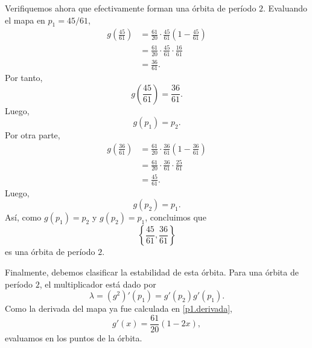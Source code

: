 \documentclass[12pt]{article}
\begin{document}
Verifiquemos ahora que efectivamente forman una órbita de período $2$. Evaluando el mapa en $p_1=45/61$,
\begin{align*}
g\left(\frac{45}{61}\right)
&=
\frac{61}{20}\cdot\frac{45}{61}
\left(1-\frac{45}{61}\right)\\
&=
\frac{61}{20}\cdot\frac{45}{61}
\cdot\frac{16}{61}\\
&=
\frac{36}{61}.
\end{align*}
Por tanto,
\begin{equation*}
    g\left(\frac{45}{61}\right)=
\frac{36}{61}.
\end{equation*}
Luego,
\begin{equation*}
g(p_1)=p_2.
\end{equation*}
Por otra parte,
\begin{align*}
g\left(\frac{36}{61}\right)
&=
\frac{61}{20}\cdot\frac{36}{61}
\left(1-\frac{36}{61}\right)\\
&=
\frac{61}{20}\cdot\frac{36}{61}
\cdot\frac{25}{61}\\
&=
\frac{45}{61}.
\end{align*}
Luego,
\begin{equation*}
g(p_2)=p_1.
\end{equation*}
Así, como $g(p_1)=p_2$ y $g(p_2)=p_1$, concluimos que
\begin{equation*}
\left\{\frac{45}{61},\frac{36}{61}\right\}
\end{equation*}
es una órbita de período $2$.

Finalmente, debemos clasificar la estabilidad de esta órbita. Para una órbita de período $2$, el multiplicador está dado por
\begin{equation} \label{p1.lambda}
\lambda=(g^2)'(p_1)=g'(p_2)g'(p_1).
\end{equation}
Como la derivada del mapa ya fue calculada en \eqref{p1.derivada},
\begin{equation*}
g'(x)=\frac{61}{20}(1-2x),
\end{equation*}
evaluamos en los puntos de la órbita.

\newpage
\end{document}
